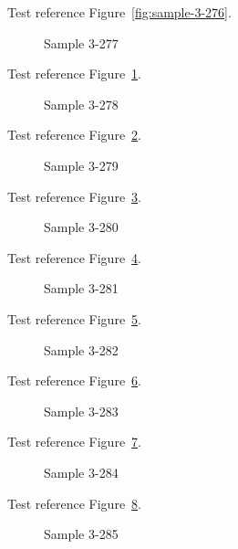 Test reference Figure~\ref{fig:sample-3-276}.

\begin{figure}[tbhp]
\caption{Sample 3-277}
\label{fig:sample-3-277}
\end{figure}

Test reference Figure~\ref{fig:sample-3-277}.

\begin{figure}[tbhp]
\caption{Sample 3-278}
\label{fig:sample-3-278}
\end{figure}

Test reference Figure~\ref{fig:sample-3-278}.

\begin{figure}[tbhp]
\caption{Sample 3-279}
\label{fig:sample-3-279}
\end{figure}

Test reference Figure~\ref{fig:sample-3-279}.

\begin{figure}[tbhp]
\caption{Sample 3-280}
\label{fig:sample-3-280}
\end{figure}

Test reference Figure~\ref{fig:sample-3-280}.

\begin{figure}[tbhp]
\caption{Sample 3-281}
\label{fig:sample-3-281}
\end{figure}

Test reference Figure~\ref{fig:sample-3-281}.

\begin{figure}[tbhp]
\caption{Sample 3-282}
\label{fig:sample-3-282}
\end{figure}

Test reference Figure~\ref{fig:sample-3-282}.

\begin{figure}[tbhp]
\caption{Sample 3-283}
\label{fig:sample-3-283}
\end{figure}

Test reference Figure~\ref{fig:sample-3-283}.

\begin{figure}[tbhp]
\caption{Sample 3-284}
\label{fig:sample-3-284}
\end{figure}

Test reference Figure~\ref{fig:sample-3-284}.

\begin{figure}[tbhp]
\caption{Sample 3-285}
\label{fig:sample-3-285}
\end{figure}

